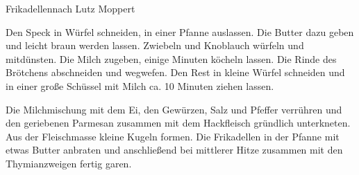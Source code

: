 \begin{recipe}{Frikadellen}{nach Lutz Moppert}
  \label{Frikadellen}
  \inglist

  \steps

Den Speck in Würfel schneiden, in einer Pfanne auslassen. Die Butter dazu geben
und leicht braun werden lassen. Zwiebeln und Knoblauch würfeln und mitdünsten.
Die Milch zugeben, einige Minuten köcheln lassen. Die Rinde des Brötchens
abschneiden und wegwefen. Den Rest in kleine Würfel schneiden und in einer
große Schüssel mit Milch ca.  10 Minuten ziehen lassen.

Die Milchmischung mit dem Ei, den Gewürzen, Salz und Pfeffer verrühren und den
geriebenen Parmesan zusammen mit dem Hackfleisch gründlich unterkneten. Aus der
Fleischmasse kleine Kugeln formen. Die Frikadellen in der Pfanne mit etwas
Butter anbraten und anschließend bei mittlerer Hitze zusammen mit den
Thymianzweigen fertig garen.

\end{recipe}
